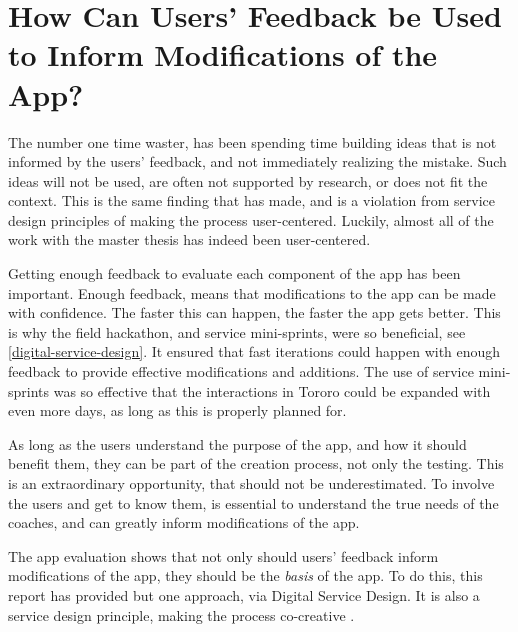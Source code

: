 
\section{How Can Users' Feedback be Used to Inform Modifications of the App?}


  The number one time waster, has been spending time building ideas that is not informed by the users' feedback, and not immediately realizing the mistake. Such ideas will not be used, are often not supported by research, or does not fit the context. This is the same finding that \cite{stickdorn} has made, and is a violation from service design principles of making the process user-centered. Luckily, almost all of the work with the master thesis has indeed been user-centered.

  Getting enough feedback to evaluate each component of the app has been important. Enough feedback, means that modifications to the app can be made with confidence. The faster this can happen, the faster the app gets better. This is why the field hackathon, and service mini-sprints, were so beneficial, see \ref{digital-service-design}. It ensured that fast iterations could happen with enough feedback to provide effective modifications and additions. The use of service mini-sprints was so effective that the interactions in Tororo could be expanded with even more days, as long as this is properly planned for.

  As long as the users understand the purpose of the app, and how it should benefit them, they can be part of the creation process, not only the testing. This is an extraordinary opportunity, that should not be underestimated. To involve the users and get to know them, is essential to understand the true needs of the coaches, and can greatly inform modifications of the app.

  The app evaluation shows that not only should users' feedback inform modifications of the app, they should be the \textit{basis} of the app. To do this, this report has provided but one approach, via Digital Service Design. It is also a service design principle, making the process co-creative \cite{stickdorn}.

